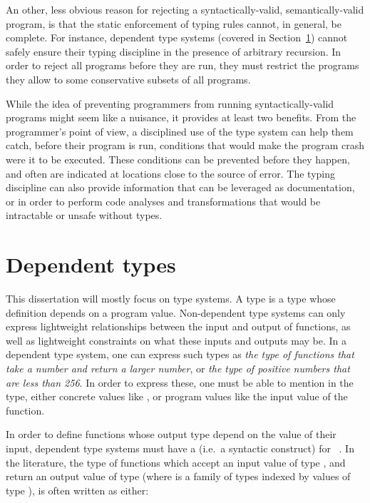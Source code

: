 An other, less obvious reason for rejecting a syntactically-valid,
semantically-valid program, is that the static enforcement of typing rules
cannot, in general, be complete.  For instance, dependent type systems (covered
in Section~\ref{dependent-types}) cannot safely ensure their typing discipline
in the presence of arbitrary recursion.  In order to reject all 
programs before they are run, they must restrict the programs they allow to some
conservative subsets of all  programs.

While the idea of preventing programmers from running syntactically-valid
programs might seem like a nuisance, it provides at least two benefits.  From
the programmer's point of view, a disciplined use of the type system can help
them catch, before their program is run, conditions that would make the program
crash were it to be executed.  These conditions can be prevented before they
happen, and often are indicated at locations close to the source of error.  The
typing discipline can also provide information that can be leveraged as
documentation, or in order to perform code analyses and transformations that
would be intractable or unsafe without types.

\section{Dependent types}
\label{dependent-types}

This dissertation will mostly focus on  type systems.  A
 type is a type whose definition depends on a program value.
Non-dependent type systems can only express lightweight relationships between
the input and output of functions, as well as lightweight constraints on what
these inputs and outputs may be.  In a dependent type system, one can express
such types as \textit{the type of functions that take a number and return a
larger number}, or \textit{the type of positive numbers that are less than 256}.
In order to express these, one must be able to mention in the type, either
concrete values like , or program values like the input value of
the function.

In order to define functions whose output type depend on the value of their
input, dependent type systems must have a  (i.e.\ a
syntactic construct) for ~\footnotemark.  In the
literature, the type of functions which accept an input value  of
type , and return an output value of type  (where
 is a family of types indexed by values of type ), is
often written as either:

